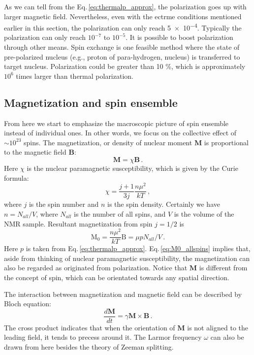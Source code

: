 As we can tell from the Eq.\,\eqref{eq:thermalp_approx}, the polarization goes up with larger magnetic field. Nevertheless, even with the ectrme conditions mentioned earlier in this section, the polarization can only reach \SI{5e-4}{}. Typically the polarization can only reach $10^{-7}$ to $10^{-5}$. It is possible to boost polarization through other means. Spin exchange is one feasible method where the state of pre-polarized nucleus (e.g., proton of para-hydrogen,  nucleus) is transferred to target nucleus. Polarization could be greater than 10 \%, which is approximately $10^6$ times larger than thermal polarization. 

\subsection{Magnetization and spin ensemble}

From here we start to emphasize the macroscopic picture of spin ensemble instead of individual ones. In other words, we focus on the collective effect of $\sim 10^{23}$ spins. The magnetization, or density of nuclear moment $\mathbf{M}$ is proportional to the magnetic field $\mathbf{B}$:
\begin{equation}
    \mathbf{M} = \chi \mathbf{B}\,.
\end{equation}
Here $\chi$ is the nuclear paramagnetic susceptibility, which is given by the Curie formula:
\begin{equation}
    \chi = \dfrac{j + 1}{3j} \dfrac{n \mu^2}{kT}\,,
\end{equation}
where $j$ is the spin number and $n$ is the spin density. Certainly we have $n = N_{all}/V$, where $N_{all}$ is the number of all spins, and $V$ is the volume of the NMR sample. Resultant magnetization from spin $j=1/2$ is
\begin{equation}
    \mathrm{M}_0 = \dfrac{n \mu^2}{kT} \mathrm{B} = \mu p N_{all}/V
    \,.\label{eq:M0_allspins}
\end{equation}
Here $p$ is taken from Eq.\,\eqref{eq:thermalp_approx}. Eq.\,\eqref{eq:M0_allspins} implies that, aside from thinking of nuclear paramagnetic susceptibility, the magnetization can also be regarded as originated from polarization. Notice that $\mathbf{M}$ is different from the concept of spin, which can be orientated towards any spatial direction. 

The interaction between magnetization and magnetic field can be described by Bloch equation\cite{Bloch_NuclearInduction_PhysRev.70.460}:
\begin{equation}\label{eq:BlochEq}
    \dfrac{d \mathbf{M}}{dt} = \gamma \mathbf{M} \times \mathbf{B}\,.
\end{equation}
The cross product indicates that when the orientation of $\mathbf{M}$ is not aligned to the leading field, it tends to precess around it. The Larmor frequency $\omega$ can also be drawn from here besides the theory of Zeeman splitting. 


